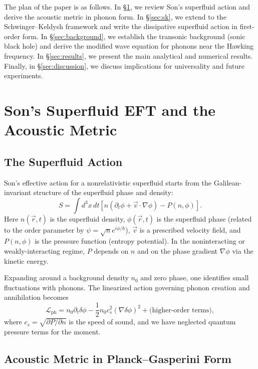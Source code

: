 \documentclass[aps,prl,twocolumn,superscriptaddress,nofootinbib,amsmath,amssymb]{revtex4-2}
\begin{document}
The plan of the paper is as follows. In \S\ref{sec:son}, we review Son's superfluid action and derive the acoustic metric in phonon form. In \S\ref{sec:sk}, we extend to the Schwinger--Keldysh framework and write the dissipative superfluid action in first-order form. In \S\ref{sec:background}, we establish the transonic background (sonic black hole) and derive the modified wave equation for phonons near the Hawking frequency. In \S\ref{sec:results}, we present the main analytical and numerical results. Finally, in \S\ref{sec:discussion}, we discuss implications for universality and future experiments.

\section{Son's Superfluid EFT and the Acoustic Metric}
\label{sec:son}

\subsection{The Superfluid Action}

Son's effective action for a nonrelativistic superfluid starts from the Galilean-invariant structure of the superfluid phase and density:
\begin{equation}
\label{eq:son_action}
S = \int d^3 x \, dt \left[ n(\partial_t \phi + \vec{v} \cdot \nabla \phi) - P(n, \phi) \right].
\end{equation}
Here $n(\vec{r}, t)$ is the superfluid density, $\phi(\vec{r}, t)$ is the superfluid phase (related to the order parameter by $\psi = \sqrt{n} e^{i\phi/\hbar}$), $\vec{v}$ is a prescribed velocity field, and $P(n, \phi)$ is the pressure function (entropy potential). In the noninteracting or weakly-interacting regime, $P$ depends on $n$ and on the phase gradient $\nabla\phi$ via the kinetic energy.

Expanding around a background density $n_0$ and zero phase, one identifies small fluctuations with phonons. The linearized action governing phonon creation and annihilation becomes
\begin{equation}
\label{eq:phonon_lagrangian}
\mathcal{L}_{\text{ph}} = n_0 \partial_t \delta\phi - \frac{1}{2}n_0 c_s^2 (\nabla \delta\phi)^2 + \text{(higher-order terms)},
\end{equation}
where $c_s = \sqrt{\partial P / \partial n}$ is the speed of sound, and we have neglected quantum pressure terms for the moment.

\subsection{Acoustic Metric in Planck--Gasperini Form}
\end{document}
